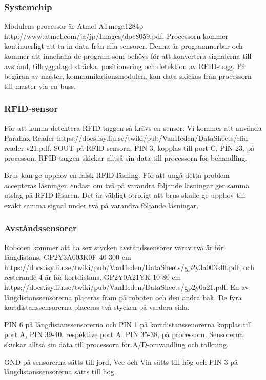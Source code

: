 \documentclass[a4paper,12pt,fleqn]{article}
\begin{document}
\subsubsection{Systemchip}
Modulens processor är Atmel ATmega1284p http://www.atmel.com/ja/jp/Images/doc8059.pdf. Processorn kommer kontinuerligt att ta in data från alla sensorer. Denna är programmerbar och kommer att innehålla de program som behövs för att konvertera signalerna till avstånd, tillryggalagd sträcka, positionering och detektion av RFID-tagg. På begäran av master, kommunikationsmodulen, kan data skickas från processorn till master via en buss.

\subsubsection{RFID-sensor}
För att kunna detektera RFID-taggen så krävs en sensor. Vi kommer att använda Parallax-Reader https://docs.isy.liu.se/twiki/pub/VanHeden/DataSheets/rfid-reader-v21.pdf. 
SOUT på RFID-sensorn, PIN 3, kopplas till port C, PIN 23, på processon. RFID-taggen skickar alltså sin data till processorn för behandling.

Brus kan ge upphov en falsk RFID-läsning. För att ungå detta problem accepteras läsningen endast om två på varandra följande läsningar ger samma utslag på RFID-läsaren. Det är väldigt otroligt att brus skulle ge upphov till exakt samma signal under två på varandra följande läsningar.

\subsubsection{Avståndssensorer}
Roboten kommer att ha sex stycken avståndssensorer varav två är för långdistans, GP2Y3A003K0F 40-300 cm https://docs.isy.liu.se/twiki/pub/VanHeden/DataSheets/gp2y3a003k0f.pdf, och resterande 4 är för kortdistans, GP2Y0A21YK 10-80 cm https://docs.isy.liu.se/twiki/pub/VanHeden/DataSheets/gp2y0a21.pdf. En av långdistanssensorerna placeras fram på roboten och den andra bak. De fyra kortdistanssensorerna placeras två stycken på vardera sida.

PIN 6 på långdistanssensorerna och PIN 1 på kortdistanssenorerna kopplas till port A, PIN 39-40, respektive port A, PIN 35-38, på processorn. Sensorerna skickar alltså sin data till processorn för A/D-omvandling och tolkning.

GND på sensorerna sätts till jord, Vcc och Vin sätts till hög och PIN 3 på långdistanssensorerna sätts till hög.
 
\end{document}
